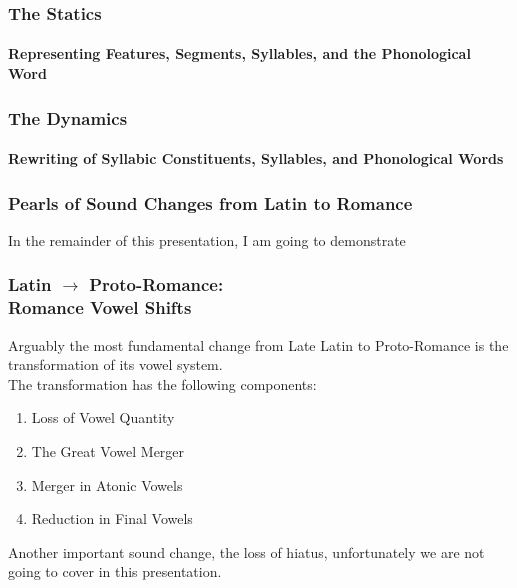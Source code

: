 \documentclass{beamer}
\begin{document}
\begin{frame}
  \frametitle{The Statics}
  \framesubtitle{Representing Features, Segments, Syllables, and the Phonological Word}


\end{frame}

\begin{frame}
  \frametitle{The Dynamics}
  \framesubtitle{Rewriting of Syllabic Constituents, Syllables, and Phonological Words}


\end{frame}

\begin{frame}
  \frametitle{Pearls of Sound Changes from Latin to Romance}

  In the remainder of this presentation, I am going to demonstrate
\end{frame}

\begin{frame}
  \frametitle{Latin $\rightarrow$ Proto-Romance: \\ Romance Vowel Shifts}

  Arguably the most fundamental change from Late Latin to Proto-Romance is the transformation of its vowel system. \\
  The transformation has the following components:
  \begin{enumerate}
  \item Loss of Vowel Quantity
  \item The Great Vowel Merger
  \item Merger in Atonic Vowels
  \item Reduction in Final Vowels
  \end{enumerate}
  Another important sound change, the loss of hiatus, unfortunately we are not going to cover in this presentation.
\end{frame}
\end{document}
